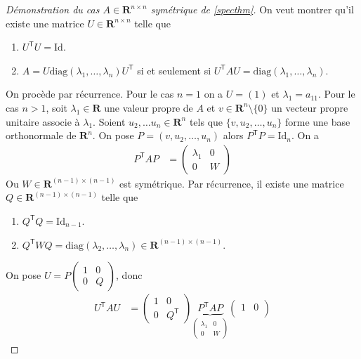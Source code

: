 \begin{proof}[Démonstration du cas $A\in \mathbf{R}^{n\times n}$ symétrique de \ref{specthm}]
On veut montrer qu'il existe une matrice $U\in \mathbf{R}^{n\times n}$ telle que
\begin{enumerate}
\item $U^{\mathsf{T}}U=\mathrm{Id}$.
\item $A=U\mathrm{diag}(\lambda_{1},\dots,\lambda _{n})U^{\mathsf{T}}$ si et seulement si $U^{\mathsf{T}}AU=\mathrm{diag}(\lambda_{1},\dots,\lambda _{n})$.
\end{enumerate}

On procède par récurrence. Pour le cas $n=1$ on a $U=(1)$ et $\lambda_{1}=a_{11}$. Pour le cas $n>1$, soit $\lambda_{1} \in \mathbf{R}$ une valeur propre de $A$ et $v\in \mathbf{R}^{n}\setminus \{ 0 \}$ un vecteur propre unitaire associe à $\lambda_{1}$. Soient $u_{2},\dots u_{n}\in \mathbf{R}^{n}$ tels que $\{ v,u_{2},\dots,u_{n} \}$ forme une base orthonormale de $\mathbf{R}^{n}$. On pose $P=(v,u_{2},\dots,u_{n})$ alors $P^{\mathsf{T}}P=\mathrm{Id}_{n}$. On a 
\begin{align*}
P^{\mathsf{T}}AP & =\begin{pmatrix}
\lambda_{1} & 0 \\
0  & W
\end{pmatrix}
\end{align*}
Ou $W\in \mathbf{R}^{(n-1)\times(n-1)}$ est symétrique. Par récurrence, il existe une matrice $Q\in \mathbf{R}^{(n-1)\times (n-1)}$ telle que
\begin{enumerate}
\item $Q^{\mathsf{T}}Q=\mathrm{Id}_{n-1}$.
\item $Q^{\mathsf{T}}WQ=\mathrm{diag}(\lambda_{2},\dots,\lambda _{n})\in \mathbf{R}^{(n-1)\times(n-1)}$.
\end{enumerate}
On pose $U=P\begin{pmatrix}1 & 0 \\ 0 & Q\end{pmatrix}$, donc
\begin{align*}
U^{\mathsf{T}}AU & =\begin{pmatrix}
1 & 0 \\
0 & Q^{\mathsf{T}} 
\end{pmatrix}\underbrace{ P^{\mathsf{T}}AP }_{ \begin{pmatrix}
\lambda_{1} & 0 \\
0 & W
\end{pmatrix} }\begin{pmatrix}
1 & 0 \\

\end{pmatrix}
\end{align*}
\end{proof}
